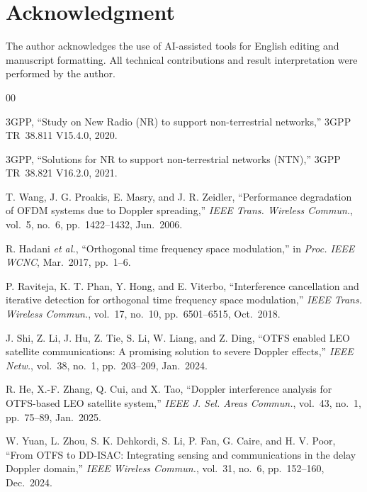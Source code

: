 ﻿\documentclass[conference]{IEEEtran}
\begin{document}
\section*{Acknowledgment}
The author acknowledges the use of AI-assisted tools for English editing and manuscript formatting. All technical contributions and result interpretation were performed by the author.

\begin{thebibliography}{00}

3GPP, ``Study on New Radio (NR) to support non-terrestrial networks,'' 3GPP TR~38.811 V15.4.0, 2020.

3GPP, ``Solutions for NR to support non-terrestrial networks (NTN),'' 3GPP TR~38.821 V16.2.0, 2021.

T. Wang, J. G. Proakis, E. Masry, and J. R. Zeidler, ``Performance degradation of OFDM systems due to Doppler spreading,'' \textit{IEEE Trans. Wireless Commun.}, vol.~5, no.~6, pp.~1422--1432, Jun.~2006.

R. Hadani \textit{et al.}, ``Orthogonal time frequency space modulation,'' in \textit{Proc. IEEE WCNC}, Mar.~2017, pp.~1--6.

P. Raviteja, K. T. Phan, Y. Hong, and E. Viterbo, ``Interference cancellation and iterative detection for orthogonal time frequency space modulation,'' \textit{IEEE Trans. Wireless Commun.}, vol.~17, no.~10, pp.~6501--6515, Oct.~2018.

J. Shi, Z. Li, J. Hu, Z. Tie, S. Li, W. Liang, and Z. Ding, ``OTFS enabled LEO satellite communications: A promising solution to severe Doppler effects,'' \textit{IEEE Netw.}, vol.~38, no.~1, pp.~203--209, Jan.~2024.

R. He, X.-F. Zhang, Q. Cui, and X. Tao, ``Doppler interference analysis for OTFS-based LEO satellite system,'' \textit{IEEE J. Sel. Areas Commun.}, vol.~43, no.~1, pp.~75--89, Jan.~2025.

W. Yuan, L. Zhou, S. K. Dehkordi, S. Li, P. Fan, G. Caire, and H. V. Poor, ``From OTFS to DD-ISAC: Integrating sensing and communications in the delay Doppler domain,'' \textit{IEEE Wireless Commun.}, vol.~31, no.~6, pp.~152--160, Dec.~2024.


\end{thebibliography}
\end{document}
